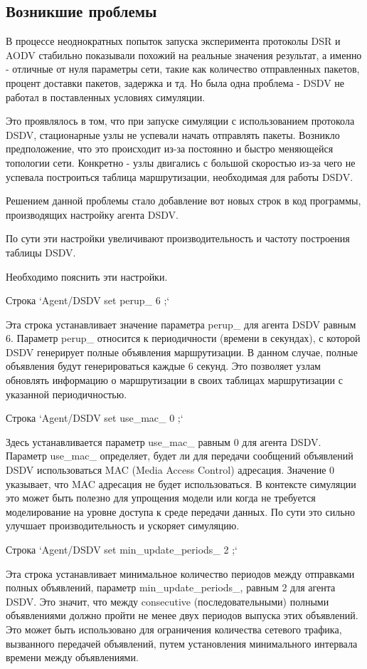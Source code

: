 \subsection*{Возникшие проблемы}

В процессе неоднократных попыток запуска эксперимента протоколы DSR и AODV стабильно показывали похожий на реальные значения результат, а именно - отличные от нуля параметры сети, такие как количество отправленных пакетов, процент доставки пакетов, задержка и тд. Но была одна проблема - DSDV не работал в поставленных условиях симуляции. 

Это проявлялось в том, что при запуске симуляции с использованием протокола DSDV, стационарные узлы не успевали начать отправлять пакеты. Возникло предположение, что это происходит из-за постоянно и быстро меняющейся топологии сети. Конкретно - узлы двигались с большой скоростью из-за чего не успевала построиться таблица маршрутизации, необходимая для работы DSDV.

Решением данной проблемы стало добавление вот новых строк в код программы, производящих настройку агента DSDV. 

По сути эти настройки увеличивают производительность и частоту построения таблицы DSDV.

Необходимо пояснить эти настройки.

Строка `Agent/DSDV set perup\_ 6 ;`

Эта строка устанавливает значение параметра perup\_ для агента DSDV равным 6. Параметр perup\_ относится к периодичности (времени в секундах), с которой DSDV генерирует полные объявления маршрутизации. В данном случае, полные объявления будут генерироваться каждые 6 секунд. Это позволяет узлам обновлять информацию о маршрутизации в своих таблицах маршрутизации с указанной периодичностью.

Строка `Agent/DSDV set use\_mac\_ 0 ;`

Здесь устанавливается параметр use\_mac\_ равным 0 для агента DSDV. Параметр use\_mac\_ определяет, будет ли для передачи сообщений объявлений DSDV использоваться MAC (Media Access Control) адресация. Значение 0 указывает, что MAC адресация не будет использоваться. В контексте симуляции это может быть полезно для упрощения модели или когда не требуется моделирование на уровне доступа к среде передачи данных. По сути это сильно улучшает производительность и ускоряет симуляцию.

Строка `Agent/DSDV set min\_update\_periods\_ 2 ;`

Эта строка устанавливает минимальное количество периодов между отправками полных объявлений, параметр min\_update\_periods\_, равным 2 для агента DSDV. Это значит, что между consecutive (последовательными) полными объявлениями должно пройти не менее двух периодов выпуска этих объявлений. Это может быть использовано для ограничения количества сетевого трафика, вызванного передачей объявлений, путем установления минимального интервала времени между объявлениями.


